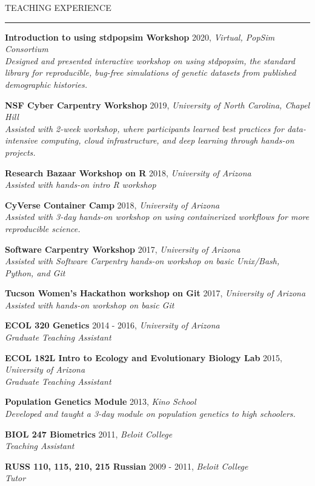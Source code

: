 \documentclass{resume} %
\renewenvironment{rSection}[1]{
\sectionskip
\textcolor{RoyalPurple}{\MakeUppercase{#1}}
\sectionlineskip
\hrule
\begin{list}{}{
\setlength{\leftmargin}{1.5em}
}
\item[]
}{
\end{list}
}
\begin{document}
\begin{rSection}{Teaching Experience}

    {\bf Introduction to using stdpopsim Workshop} \hfill 2020, {\em Virtual, PopSim Consortium} \\ 
    {\em Designed and presented interactive workshop on using stdpopsim, the standard library for reproducible, bug-free simulations of genetic datasets from published demographic histories.}

    {\bf NSF Cyber Carpentry Workshop} \hfill 2019, {\em University of North Carolina, Chapel Hill} \\ 
    {\em Assisted with 2-week workshop, where participants learned best practices for data-intensive computing, cloud infrastructure, and deep learning through hands-on projects.}

    {\bf Research Bazaar Workshop on R} \hfill 2018, {\em University of Arizona} \\ 
    {\em Assisted with hands-on intro R workshop}

    {\bf CyVerse Container Camp} \hfill 2018, {\em University of Arizona} \\ 
    {\em Assisted with 3-day hands-on workshop on using containerized workflows for more reproducible science.}

    {\bf Software Carpentry Workshop} \hfill 2017, {\em University of Arizona} \\ 
    {\em Assisted with Software Carpentry hands-on workshop on basic Unix/Bash, Python, and Git}

    {\bf Tucson Women’s Hackathon workshop on Git} \hfill 2017, {\em University of Arizona} \\ 
    {\em Assisted with hands-on workshop on basic Git}

    {\bf ECOL 320 Genetics} \hfill 2014 - 2016, {\em University of Arizona} \\ 
    {\em Graduate Teaching Assistant}

    {\bf ECOL 182L Intro to Ecology and Evolutionary Biology Lab} \hfill 2015, {\em University of Arizona} \\ 
    {\em Graduate Teaching Assistant}

    {\bf Population Genetics Module} \hfill 2013, {\em Kino School} \\ 
    {\em Developed and taught a 3-day module on population genetics to high schoolers.}

    {\bf BIOL 247 Biometrics} \hfill 2011, {\em Beloit College} \\ 
    {\em Teaching Assistant}

    {\bf RUSS 110, 115, 210, 215 Russian} \hfill 2009 - 2011, {\em Beloit College} \\ 
    {\em Tutor}

\end{rSection}
\end{document}
